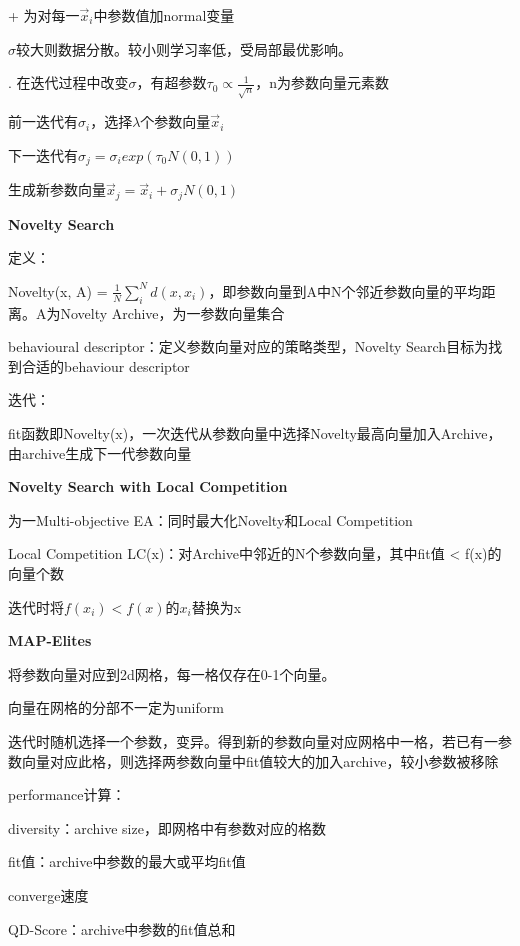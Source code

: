 \documentclass[UTF8]{ctexart}
\begin{document}
  \quad \quad \quad + 为对每一$\vec{x}_i$中参数值加normal变量

  \quad \quad \quad $\sigma$较大则数据分散。较小则学习率低，受局部最优影响。

  \quad {}. 在迭代过程中改变$\sigma$，有超参数$\tau_0 \propto \frac{1}{\sqrt{n}}$，n为参数向量元素数

  \quad \quad \quad 前一迭代有$\sigma_i$，选择$\lambda$个参数向量$\vec{x}_i$

  \quad \quad \quad 下一迭代有$\sigma_j = \sigma_i exp(\tau_0N(0, 1))$

  \quad \quad \quad 生成新参数向量$\vec{x}_j = \vec{x}_i + \sigma_jN(0, 1)$

  \textbf{Novelty Search}

  \quad 定义：
  
  \quad \quad Novelty(x, A) = $\frac{1}{N}\sum_i^{N}d(x, x_i)$，即参数向量到A中N个邻近参数向量的平均距离。A为Novelty Archive，为一参数向量集合

  \quad \quad behavioural descriptor：定义参数向量对应的策略类型，Novelty Search目标为找到合适的behaviour descriptor

  \quad 迭代：

  \quad \quad fit函数即Novelty(x)，一次迭代从参数向量中选择Novelty最高向量加入Archive，由archive生成下一代参数向量

  \textbf{Novelty Search with Local Competition}

  \quad 为一Multi-objective EA：同时最大化Novelty和Local Competition

  \quad Local Competition LC(x)：对Archive中邻近的N个参数向量，其中fit值 < f(x)的向量个数

  \quad \quad 迭代时将$f(x_i) < f(x)$的$x_i$替换为x

  \textbf{MAP-Elites}

  \quad 将参数向量对应到2d网格，每一格仅存在0-1个向量。

  \quad \quad 向量在网格的分部不一定为uniform

  \quad 迭代时随机选择一个参数，变异。得到新的参数向量对应网格中一格，若已有一参数向量对应此格，则选择两参数向量中fit值较大的加入archive，较小参数被移除

  \quad performance计算：

  \quad \quad diversity：archive size，即网格中有参数对应的格数

  \quad \quad fit值：archive中参数的最大或平均fit值

  \quad \quad converge速度

  \quad \quad QD-Score：archive中参数的fit值总和
\end{document}

